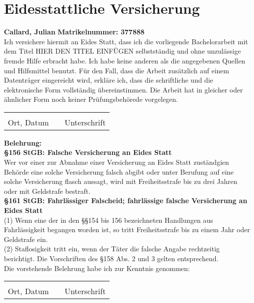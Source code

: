 \section{Eidesstattliche Versicherung}
\vspace{1cm}
\flushleft
\large
\textbf{Callard, Julian}
\hfill
\textbf{Matrikelnummer: 377888}\\
\vspace{1cm}
\large
Ich versichere hiermit an Eides Statt, dass ich die vorliegende Bachelorarbeit mit dem Titel HIER DEN TITEL EINFÜGEN selbstständig und ohne unzulässige fremde Hilfe erbracht habe. Ich habe keine anderen als die angegebenen Quellen und Hilfsmittel benutzt. Für den Fall, dass die Arbeit zusätzlich auf einem Datenträger eingereicht wird, erkläre ich, dass die schriftliche und die elektronische Form vollständig übereinstimmen. Die Arbeit hat in gleicher oder ähnlicher Form noch keiner Prüfungsbehörede vorgelegen.\\
\vspace{1.75cm}
\begin{tabular}{lll}
	\makebox[5cm]{\hrulefill}  & \hspace{4.75cm} & \makebox[5cm]{\hrulefill}\\
	Ort, Datum & \hspace{4.75cm} & Unterschrift	
\end{tabular}
\vfill
\small
\textbf{Belehrung:}\\
\textbf{\S 156 StGB: Falsche Versicherung an Eides Statt}\\
Wer vor einer zur Abnahme einer Versicherung an Eides Statt zuständgien Behörde eine solche Versicherung falsch abgibt oder unter Berufung auf eine solche Versicherung flasch aussagt, wird mit Freiheitsstrafe bis zu drei Jahren oder mit Geldstrafe bestraft.\\
\vspace{0.5cm}
\textbf{\S 161 StGB: Fahrlässiger Falscheid; fahrlässige falsche Versicherung an Eides Statt}\\
(1) Wenn eine der in den \S\S 154 bis 156 bezeichneten Handlungen aus Fahrlässigkeit begangen worden ist, so tritt Freiheitsstrafe bis zu einem Jahr oder Geldstrafe ein.\\
(2) Staflosigkeit tritt ein, wenn der Täter die falsche Angabe rechtzeitig berichtigt. Die Vorschriften des \S 158 Abs. 2 und 3 gelten entsprechend.\\
\large
\vspace{0.2cm}
Die vorstehende Belehrung habe ich zur Kenntnis genommen:\\
\vspace{1.75cm}
\begin{tabular}{lll}
	\makebox[5cm]{\hrulefill}  & \hspace{4.75cm} & \makebox[5cm]{\hrulefill}\\
	Ort, Datum & \hspace{4.75cm} & Unterschrift	
\end{tabular}

